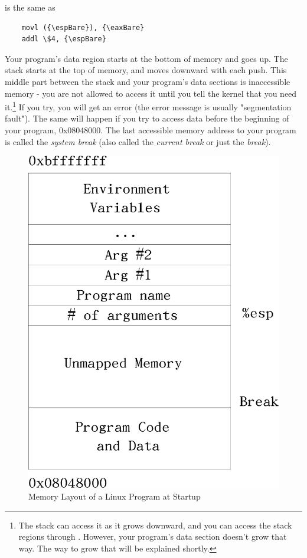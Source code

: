 is the same as

\begin{simpletyping}
\begin{lstlisting}
	movl ({\espBare}), {\eaxBare}
	addl \$4, {\espBare}
\end{lstlisting}
\end{simpletyping}

Your program's data region starts at the bottom of memory and goes up.
The stack starts at the top of memory, and moves downward with each push.
This middle part between the stack and your program's data sections is 
inaccessible memory - you are not allowed to 
access it until you tell the kernel that you need it.\footnote{The
stack can access it as it grows downward, and you can access the stack
regions through {\espRegIdx}.  However, your program's data section
doesn't grow that way.  The way to grow that will be explained shortly.}
If you try, you
will get an error (the error message is usually "segmentation fault").  
The same will happen if you try to
access data before the beginning of your program, 0x08048000.  
The last accessible memory address to your program is called the 
\emph{system break}
(also called the \emph{current break} or just the \emph{break}).

\begin{figure}
\caption{Memory Layout of a Linux Program at Startup}
\includegraphics[width=\textwidth]{memorylayout.png}
\end{figure}

